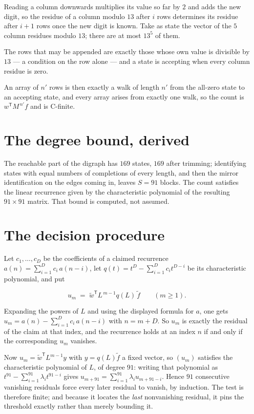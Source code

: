 \documentclass[11pt]{article}
\theoremstyle{definition}
\begin{document}
Reading a column downwards multiplies its value so far by $2$ and adds the new digit, so the residue of a column modulo $13$ after $i$ rows determines its residue after $i+1$ rows once the new digit is known. Take as state the vector of the $5$ column residues modulo $13$; there are at most $13^{5}$ of them.

The rows that may be appended are exactly those whose own value is divisible by $13$ --- a condition on the row alone --- and a state is accepting when every column residue is zero.

An array of $n'$ rows is then exactly a walk of length $n'$ from the all-zero state to an accepting state, and every array arises from exactly one walk, so the count is $w^{\mathsf T}M^{\,n'}f$ and is C-finite.

\section{The degree bound, derived}

The reachable part of the digraph has $169$ states, $169$ after trimming; identifying states with equal numbers of completions of every length, and then the mirror identification on the edges coming in, leaves $S = 91$ blocks. The count satisfies the linear recurrence given by the characteristic polynomial of the resulting $91\times91$ matrix. That bound is computed, not assumed.

\section{The decision procedure}

Let $c_1,\dots,c_D$ be the coefficients of a claimed recurrence $a(n) = \sum_{i=1}^{D} c_i\,a(n-i)$, let $q(t) = t^{D} - \sum_{i=1}^{D} c_i t^{D-i}$ be its characteristic polynomial, and put

\[u_m \;=\; \tilde w^{\mathsf T} L^{\,m-1} q(L)\,\tilde f \qquad (m \ge 1).\]

Expanding the powers of $L$ and using the displayed formula for $a$, one gets $u_m = a(n) - \sum_{i=1}^{D} c_i\,a(n-i)$ with $n = m + D$. So $u_m$ is exactly the residual of the claim at that index, and the recurrence holds at an index $n$ if and only if the corresponding $u_m$ vanishes.

Now $u_m = \tilde w^{\mathsf T} L^{m-1} y$ with $y = q(L)\tilde f$ a fixed vector, so $(u_m)$ satisfies the characteristic polynomial of $L$, of degree $91$: writing that polynomial as $t^{91} - \sum_{i=1}^{91} \lambda_i t^{91-i}$ gives $u_{m+91} = \sum_{i=1}^{91} \lambda_i u_{m+91-i}$. Hence $91$ consecutive vanishing residuals force every later residual to vanish, by induction. The test is therefore finite; and because it locates the {\itshape last} nonvanishing residual, it pins the threshold exactly rather than merely bounding it.
\end{document}

